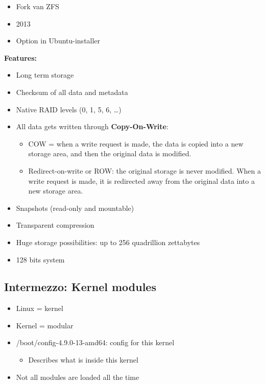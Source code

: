 \documentclass{article}
\begin{document}
\begin{itemize}
    \item Fork van ZFS
    \item 2013
    \item Option in Ubuntu-installer
\end{itemize}

\textbf{Features:}

\begin{itemize}
    \item Long term storage
    \item Checksum of all data and metadata
    \item Native RAID levels (0, 1, 5, 6, \dots)
    \item All data gets written through \textbf{Copy-On-Write}:
    \begin{itemize}
        \item COW = when a write request is made, the data is copied into a new storage area, and then the original data is modified.
        \item Redirect-on-write or ROW: the original storage is never modified. When a write request is made, it is redirected away from the original data into a new storage area.
    \end{itemize}
    \item Snapshots (read-only and mountable)
    \item Transparent compression
    \item Huge storage possibilities: up to 256 quadrillion zettabytes
    \item 128 bits system
\end{itemize}

\subsection{Intermezzo: Kernel modules}

\begin{itemize}
    \item Linux = kernel
    \item Kernel = modular
    \item /boot/config-4.9.0-13-amd64: config for this kernel
    \begin{itemize}
        \item Describes what is inside this kernel
    \end{itemize}
    \item Not all modules are loaded all the time
\end{itemize}
\end{document}
